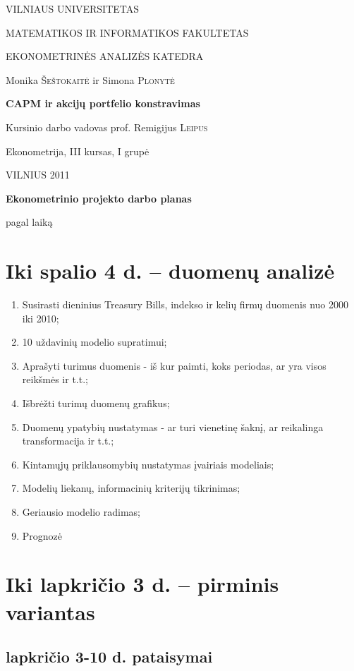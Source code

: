 \documentclass[a4paper]{article}
\begin{document}
\begin{titlepage}
\centerline{ \large VILNIAUS UNIVERSITETAS}
\bigskip
\centerline{\large MATEMATIKOS IR INFORMATIKOS FAKULTETAS}
\smallskip

\centerline{\large  EKONOMETRINĖS ANALIZĖS KATEDRA}
\vskip 200pt
\centerline{ \large Monika \textsc{Šeštokaitė} ir \large Simona \textsc{Plonytė}}
\vskip 50pt
\centerline{\bf \Large CAPM ir akcijų portfelio konstravimas}
\bigskip
\vskip 25pt
\centerline{Kursinio darbo vadovas prof. \large {Remigijus} \textsc{Leipus}}
\vskip 25pt
\hfill Ekonometrija, III kursas, I grupė
\vskip 100pt
\centerline{\large VILNIUS 2011}
\end{titlepage}

\pagebreak

\centerline{\bf \Large Ekonometrinio projekto darbo planas}
\centerline{pagal laiką}

\section{ Iki spalio 4 d. -- duomenų analizė }


\begin{enumerate}
\item {Susirasti dieninius Treasury Bills, indekso ir kelių firmų duomenis nuo 2000 iki 2010;}
\item {10 uždavinių modelio supratimui;}
\item {Aprašyti turimus duomenis - iš kur paimti, koks periodas, ar yra visos reikšmės ir t.t.;}
\item {Išbrėžti turimų duomenų grafikus;}
\item {Duomenų ypatybių nustatymas - ar turi vienetinę šaknį, ar reikalinga transformacija ir t.t.;}
\item {Kintamųjų priklausomybių nustatymas įvairiais modeliais;}
\item {Modelių liekanų, informacinių kriterijų tikrinimas;}
\item {Geriausio modelio radimas;}
\item {Prognozė}
\end{enumerate}


\section{ Iki lapkričio 3 d. -- pirminis variantas}
\subsection{lapkričio 3-10 d. pataisymai}
\end{document}

